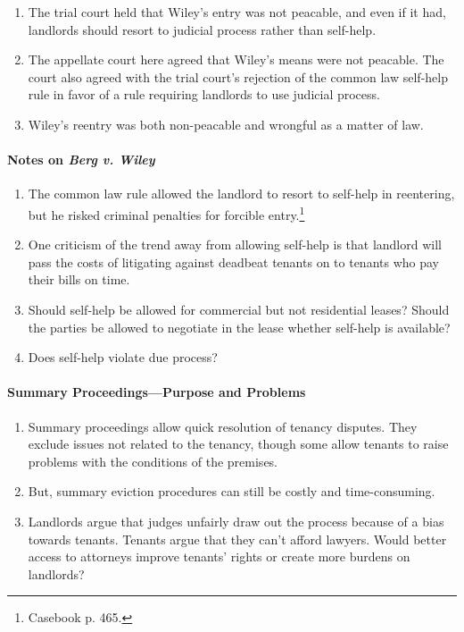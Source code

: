 \begin{enumerate}
\begin{enumerate}
\begin{enumerate}
            \item The trial court held that Wiley's entry was not peacable, 
            and even if it had, landlords should resort to judicial process 
            rather than self-help.
            \item The appellate court here agreed that Wiley's means were not 
            peacable. The court also agreed with the trial court's rejection 
            of the common law self-help rule in favor of a rule requiring 
            landlords to use judicial process.
            \item Wiley's reentry was both non-peacable and wrongful as a 
            matter of law.
        \end{enumerate}
    \end{enumerate}
\end{enumerate}

\paragraph{Notes on \emph{Berg v. Wiley}}

\begin{enumerate}
    \item The common law rule allowed the landlord to resort to self-help in 
    reentering, but he risked criminal penalties for forcible 
    entry.\footnote{Casebook p. 465.}
    \item One criticism of the trend away from allowing self-help is that 
    landlord will pass the costs of litigating against deadbeat tenants on to 
    tenants who pay their bills on time.
    \item Should self-help be allowed for commercial but not residential 
    leases? Should the parties be allowed to negotiate in the lease whether 
    self-help is available?
    \item Does self-help violate due process?
\end{enumerate}

\paragraph{Summary Proceedings---Purpose and Problems}

\begin{enumerate}
    \item Summary proceedings allow quick resolution of tenancy disputes. They 
    exclude issues not related to the tenancy, though some allow tenants to 
    raise problems with the conditions of the premises.
    \item But, summary eviction procedures can still be costly and 
    time-consuming.
    \item Landlords argue that judges unfairly draw out the process because of 
    a bias towards tenants. Tenants argue that they can't afford lawyers. 
    Would better access to attorneys improve tenants' rights or create more 
    burdens on landlords?
\end{enumerate}


